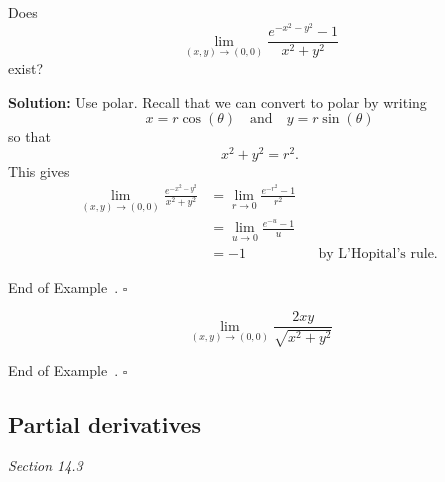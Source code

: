 \documentclass[10pt]{article}
\theoremstyle{definition}
\newtheorem{example}[theorem]{Example}
\renewenvironment{example}
{\begin{oldexample}}
  {\par\smallskip\hfill   End of Example~\theexample. $\square$    \par\end{oldexample}}
\newcommand{\fl}{\noindent\textbf} %
\newcommand{\1}[1]{\textbf{1}_{\left[#1\right]}} %
\begin{document}
\begin{example}
  Does
  \begin{equation*}
    \lim_{(x,y)\to (0,0)} \frac{e^{-x^{2}-y^{2}}-1}{x^{2}+y^{2}}
  \end{equation*}
  exist?

  \fl{Solution:} Use polar. Recall that we can convert to polar by writing
  \begin{equation*}
    x = r\cos(\theta) \quad \text{and} \quad  y = r\sin(\theta)
  \end{equation*}
  so that
  \begin{equation*}
    x^{2}+y^{2} = r^{2}.
  \end{equation*}
  This gives
  \begin{align*}
    \lim_{(x,y)\to (0,0)}\frac{e^{-x^{2}-y^{2}}}{x^{2}+y^{2}} 
    &= \lim_{r \to 0}\frac{e^{-r^{2}}-1}{r^{2}}\\
    &= \lim_{u \to 0} \frac{e^{-u}-1}{u}\\
    &= -1 &&\text{by L'Hopital's rule. }
\end{align*}
 
\end{example}

\begin{example}
  \begin{equation*}
    \lim_{(x,y)\to(0,0)} \frac{2xy}{\sqrt{x^{2}+y^{2}}}
  \end{equation*}
\end{example}

\subsection{Partial derivatives}
\textit{Section 14.3}
\end{document}
